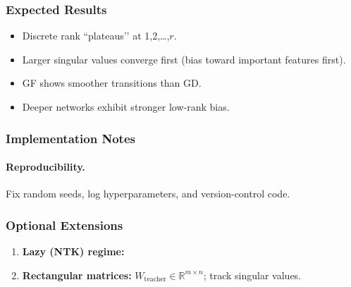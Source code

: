 \documentclass[11pt]{article}
\newcommand{\R}{\mathbb{R}}
\newcommand{\Wteacher}{\ensuremath{W_{\mathrm{teacher}}}}
\begin{document}
\subsubsection*{Expected Results}

\begin{itemize}[nosep]
  \item Discrete rank “plateaus’’ at 1,2,\dots,\(r\).
  \item Larger singular values converge first (bias toward important features first).
  \item GF shows smoother transitions than GD.
  \item Deeper networks exhibit stronger low-rank bias.
\end{itemize}

\subsubsection*{Implementation Notes}

\paragraph*{Reproducibility.}
Fix random seeds, log hyperparameters, and version-control code.

\subsubsection*{Optional Extensions}

\begin{enumerate}[label=\textbf{\Alph*.},leftmargin=*,nosep]
  \item \textbf{Lazy (NTK) regime:}
  \item \textbf{Rectangular matrices:} \(\Wteacher\in\R^{m\times n}\); track singular values.
\end{enumerate}
\end{document}
